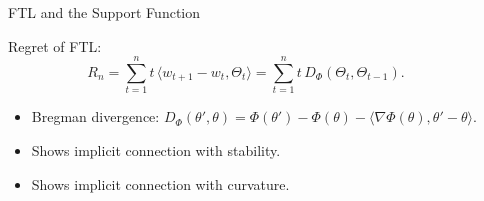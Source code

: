 \documentclass[final]{beamer} %
\newcommand{\ip}[1]{\langle#1\rangle}
\begin{document}
\begin{frame}[c]
\begin{columns}[t,totalwidth=\textwidth]
\begin{column}{.24\textwidth}
\begin{block}{FTL and the Support Function}
			\begin{minipage}{.9\linewidth}
			\begin{alertblock}{Regret of FTL: }
				\vspace{-1cm}
				\[
				R_n = \sum_{t=1}^n t\,\ip{ w_{t+1}-w_t,\Theta_t} = \sum_{t=1}^{n} t\,D_{\Phi}(\Theta_t,\Theta_{t-1}).
				\]
				\begin{itemize}
					\item Bregman divergence: $D_{\Phi}(\theta', \theta) = \Phi(\theta') - \Phi(\theta) - \ip{ \nabla\Phi(\theta), \theta' - \theta}$.
					\item Shows implicit connection with stability.
					\item Shows implicit connection with curvature. 
				\end{itemize}
			\end{alertblock}
			\end{minipage}
		
		\end{block}

	\end{column}
	\begin{column}{0.01\textwidth}
	\end{column}
	

\end{columns}
\end{frame}
\end{document}
